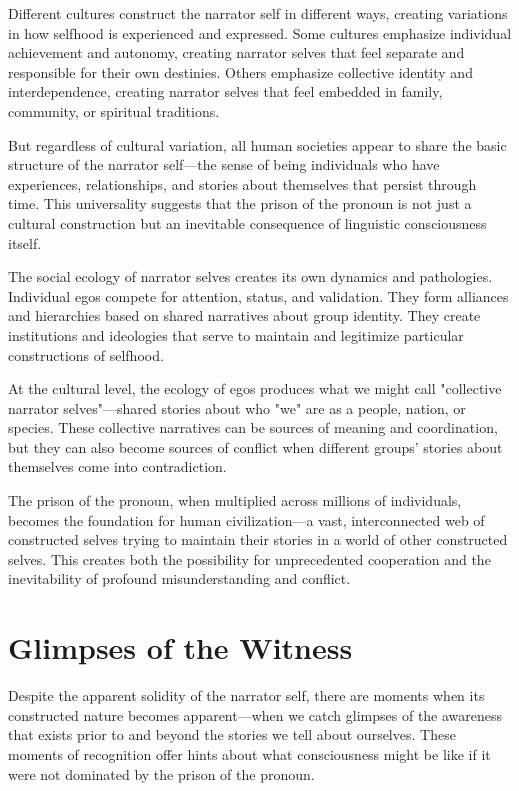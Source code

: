 Different cultures construct the narrator self in different ways, creating variations in how selfhood is experienced and expressed. Some cultures emphasize individual achievement and autonomy, creating narrator selves that feel separate and responsible for their own destinies. Others emphasize collective identity and interdependence, creating narrator selves that feel embedded in family, community, or spiritual traditions.

But regardless of cultural variation, all human societies appear to share the basic structure of the narrator self—the sense of being individuals who have experiences, relationships, and stories about themselves that persist through time. This universality suggests that the prison of the pronoun is not just a cultural construction but an inevitable consequence of linguistic consciousness itself.

The social ecology of narrator selves creates its own dynamics and pathologies. Individual egos compete for attention, status, and validation. They form alliances and hierarchies based on shared narratives about group identity. They create institutions and ideologies that serve to maintain and legitimize particular constructions of selfhood.

At the cultural level, the ecology of egos produces what we might call "collective narrator selves"—shared stories about who "we" are as a people, nation, or species. These collective narratives can be sources of meaning and coordination, but they can also become sources of conflict when different groups' stories about themselves come into contradiction.

The prison of the pronoun, when multiplied across millions of individuals, becomes the foundation for human civilization—a vast, interconnected web of constructed selves trying to maintain their stories in a world of other constructed selves. This creates both the possibility for unprecedented cooperation and the inevitability of profound misunderstanding and conflict.

\section{Glimpses of the Witness}

Despite the apparent solidity of the narrator self, there are moments when its constructed nature becomes apparent—when we catch glimpses of the awareness that exists prior to and beyond the stories we tell about ourselves. These moments of recognition offer hints about what consciousness might be like if it were not dominated by the prison of the pronoun.

